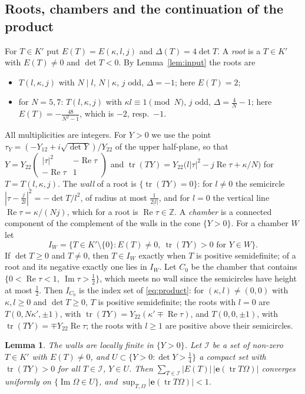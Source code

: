 \documentclass[11pt]{amsart}
\numberwithin{equation}{section}
\theoremstyle{plain}
\newtheorem{lem}[thm]{Lemma}
\theoremstyle{definition}
\theoremstyle{remark}
\newcommand{\Z}{\mathbb{Z}}
\newcommand{\e}{\mathbf{e}}
\newcommand{\sm}[4]{\left(\begin{smallmatrix}#1&#2\\#3&#4\end{smallmatrix}\right)}
\begin{document}
\subsection{Roots, chambers and the continuation of the product}\label{app:conv}
For $T\in K'$ put $E(T)=E(\kappa,l,j)$ and $\Delta(T)=4\det T$. A \emph{root} is a $T\in K'$ with $E(T)\ne0$ and $\det T<0$. By Lemma~\ref{lem:input} the roots are
\begin{itemize}
\item[(Z)] $T(l,\kappa,j)$ with $N\mid l$, $N\mid\kappa$, $j$ odd, $\Delta=-1$; here $E(T)=2$;
\item[(P)] for $N=5,7$: $T(l,\kappa,j)$ with $\kappa l\equiv1\pmod N$, $j$ odd, $\Delta=\frac4N-1$; here $E(T)=-\frac{48}{N^2-1}$, which is $-2$, resp.\ $-1$.
\end{itemize}
All multiplicities are integers. For $Y>0$ we use the point $\tau_Y=(-Y_{12}+i\sqrt{\det Y})/Y_{22}$ of the upper half-plane, so that $Y=Y_{22}\sm{|\tau|^2}{-\operatorname{Re}\tau}{-\operatorname{Re}\tau}1$ and $\operatorname{tr}(TY)=Y_{22}\bigl(l|\tau|^2-j\operatorname{Re}\tau+\kappa/N\bigr)$ for $T=T(l,\kappa,j)$. The \emph{wall} of a root is $\{\operatorname{tr}(TY)=0\}$: for $l\ne0$ the semicircle $|\tau-\frac j{2l}|^2=-\det T/l^2$, of radius at most $\frac1{2|l|}$, and for $l=0$ the vertical line $\operatorname{Re}\tau=\kappa/(Nj)$, which for a root is $\operatorname{Re}\tau\in\Z$. A \emph{chamber} is a connected component of the complement of the walls in the cone $\{Y>0\}$. For a chamber $W$ let
\[
I_W=\{T\in K'\setminus\{0\}:E(T)\ne0,\ \operatorname{tr}(TY)>0\text{ for }Y\in W\}.
\]
If $\det T\ge0$ and $T\ne0$, then $T\in I_W$ exactly when $T$ is positive semidefinite; of a root and its negative exactly one lies in $I_W$. Let $C_0$ be the chamber that contains $\{0<\operatorname{Re}\tau<1,\ \operatorname{Im}\tau>\frac12\}$, which meets no wall since the semicircles have height at most $\frac12$. Then $I_{C_0}$ is the index set of \eqref{eq:product}: for $(\kappa,l)\ne(0,0)$ with $\kappa,l\ge0$ and $\det T\ge0$, $T$ is positive semidefinite; the roots with $l=0$ are $T(0,N\kappa',\pm1)$, with $\operatorname{tr}(TY)=Y_{22}(\kappa'\mp\operatorname{Re}\tau)$, and $T(0,0,\pm1)$, with $\operatorname{tr}(TY)=\mp Y_{22}\operatorname{Re}\tau$; the roots with $l\ge1$ are positive above their semicircles.

\begin{lem}\label{lem:conv}
The walls are locally finite in $\{Y>0\}$. Let $\mathcal I$ be a set of non-zero $T\in K'$ with $E(T)\ne0$, and $U\subset\{Y>0:\det Y>\frac14\}$ a compact set with $\operatorname{tr}(TY)>0$ for all $T\in\mathcal I$, $Y\in U$. Then $\sum_{T\in\mathcal I}|E(T)|\,|\e(\operatorname{tr}T\Omega)|$ converges uniformly on $\{\operatorname{Im}\Omega\in U\}$, and $\sup_{T,\Omega}|\e(\operatorname{tr}T\Omega)|<1$.
\end{lem}
\end{document}
